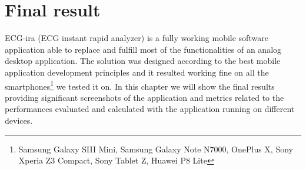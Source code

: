 \chapter{Final result}
ECG-ira (ECG instant rapid analyzer) is a fully working mobile software application able to replace and fulfill most of the functionalities of an analog desktop application. The solution was designed according to the best mobile application development principles and it resulted working fine on all the smartphones\footnote{Samsung Galaxy SIII Mini, Samsung Galaxy Note N7000, OnePlus X, Sony Xperia Z3 Compact, Sony Tablet Z, Huawei P8 Lite} we tested it on. In this chapter we will show the final results providing significant screenshots of the application and metrics related to the performances evaluated and calculated with the application running on different devices.

